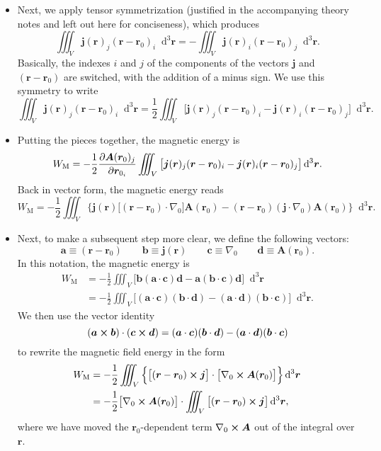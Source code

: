 \documentclass[11pt, a4paper]{article}
\newcommand{\diff}{\mathop{}\!\mathrm{d}} %
\newcommand{\dr}{\diff^{3} \r}  %
\renewcommand{\vec}[1]{\bm{#1}} %
\renewcommand{\r}{\vec{r}}
\newcommand{\A}{\vec{A}} %
\renewcommand{\j}{\vec{j}}  %
\renewcommand{\grad}{\nabla}
\begin{document}
\begin{itemize}
    \item Next, we apply tensor symmetrization (justified in the accompanying theory notes and left out here for conciseness), which produces
	\begin{equation*}
		\iiint_{V}\j(\r)_{j} (\r - \r_{0})_{i} \dr = - \iiint_{V} \j(\r)_{i}(\r - \r_{0})_{j}\dr.
	\end{equation*}
    Basically, the indexes $ i $ and $ j $ of the components of the vectors $ \j $ and $ (\r - \r_{0}) $ are switched, with the addition of a minus sign. We use this symmetry to write
	\begin{equation*}
		\iiint_{V}\j(\r)_{j} (\r - \r_{0})_{i} \dr = \frac{1}{2}\iiint_{V}  \big[\j(\r)_{j} (\r - \r_{0})_{i} - \j(\r)_{i}(\r - \r_{0})_{j}\big]\dr.
	\end{equation*}
	
	\item Putting the pieces together, the magnetic energy is
	\begin{equation*}
		W_{\text{M}} = -\frac{1}{2}\pdv{\A(\r_{0})_{j}}{\r_{0_{i}}} \iiint_{V}  \big[\j(\r)_{j} (\r - \r_{0})_{i} - \j(\r)_{i}(\r - \r_{0})_{j}\big]\dr.
	\end{equation*}
	Back in vector form, the magnetic energy reads
	\begin{equation*}
		W_{\text{M}} = - \frac{1}{2}\iiint_{V} \Big\{\j(\r) \big[ (\r - \r_{0})\cdot \grad_{0} \big ] \A(\r_{0}) - (\r - \r_{0})(\j\cdot \grad_{0})\A(\r_{0}) \Big\} \dr.
	\end{equation*}
	
    \item Next, to make a subsequent step more clear, we define the following vectors:
	\begin{equation*}
		\vec{a} \equiv (\r - \r_{0}) \qquad \vec{b} \equiv \j(\r) \qquad \vec{c} \equiv \grad_{0} \qquad \vec{d} \equiv \A(\r_{0}).
	\end{equation*}
	In this notation, the magnetic energy is
	\begin{align*}
		W_{\text{M}} &= -\frac{1}{2}\iiint_{V}\Big[\vec{b}   (\vec{a} \cdot \vec{c}) \vec{d} - \vec{a}(\vec{b}\cdot \vec{c})\vec{d} \Big] \dr\\
		& = -\frac{1}{2}\iiint_{V}\Big[(\vec{a} \cdot \vec{c}) (\vec{b}\cdot\vec{d}) - (\vec{a} \cdot \vec{d}) (\vec{b}\cdot \vec{c}) \Big] \dr.
	\end{align*}
	We then use the vector identity
	\begin{equation*}
		(\vec{a}\cross \vec{b}) \cdot (\vec{c} \cross \vec{d}) = 	(\vec{a}\cdot \vec{c}) (\vec{b} \cdot \vec{d}) - 	(\vec{a}\cdot \vec{d}) (\vec{b} \cdot \vec{c})
	\end{equation*}
	to rewrite the magnetic field energy in the form
	\begin{align*}
		W_{\text{M}} &= - \frac{1}{2}\iiint_{V} \Big\{\big[(\r - \r_{0}) \cross \j\big] \cdot \big[\grad_{0}\cross \A(\r_{0})\big] \Big\}\dr\\
		& = -\frac{1}{2} \big[\grad_{0}\cross \A(\r_{0})\big] \cdot \iiint_{V}\big[(\r - \r_{0}) \cross \j\big] \dr,
	\end{align*}
	where we have moved the $ \r_{0} $-dependent term $ \grad_{0} \cross \A $ out of the integral over $ \r $. 
	

\end{itemize}
\end{document}
